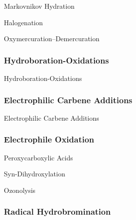 \documentclass[10pt]{article}
\begin{document}
      \begin{core}{Markovnikov Hydration}

      \end{core}

      \begin{core}{Halogenation}

      \end{core}

      \begin{core}{Oxymercuration--Demercuration}

      \end{core}

    \subsubsection{Hydroboration-Oxidations}

      \begin{core}{Hydroboration-Oxidations}

      \end{core}

    \subsubsection{Electrophilic Carbene Additions}

      \begin{core}{Electrophilic Carbene Additions}

      \end{core}

    \subsubsection{Electrophile Oxidation}

      \begin{core}{Peroxycarboxylic Acids}

      \end{core}

      \begin{core}{ Syn-Dihydroxylation}

      \end{core}

      \begin{core}{Ozonolysis}

      \end{core}

    \subsubsection{Radical Hydrobromination}
\end{document}
